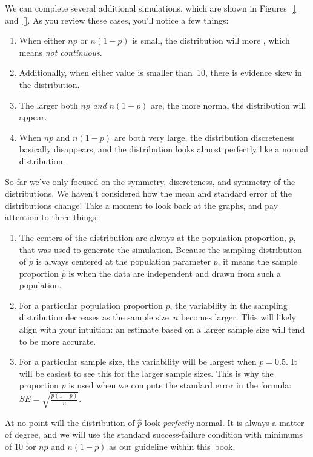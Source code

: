 We can complete several additional simulations, which are
shown in
Figures~\ref{}
and~\ref{}.
As you review these cases, you'll notice a few things:
\begin{enumerate}
\item When either $np$ or $n(1 - p)$ is small, the
    distribution will more , which means
    \emph{not continuous}.
\item Additionally, when either value is smaller
    than~10, there is evidence skew in the distribution.
\item The larger both $np$ \emph{and} $n(1 - p)$ are,
    the more normal the distribution will appear.
\item When $np$ and $n(1 - p)$ are both very large,
    the distribution discreteness basically disappears,
    and the distribution looks almost perfectly
    like a normal distribution.
\end{enumerate}

So far we've only focused on the symmetry, discreteness,
and symmetry of the distributions. We haven't considered
how the mean and standard error
of the distributions change!
Take a moment to look back at the graphs,
and pay attention to three things:
\begin{enumerate}
\item The centers of the distribution are always at
    the population proportion, $p$, that was used to
    generate the simulation. Because the sampling
    distribution of $\hat{p}$ is always centered at
    the population parameter $p$, it means the sample
    proportion $\hat{p}$ is  when
    the data are independent and drawn from such
    a population.
\item For a particular population proportion $p$,
    the variability in the sampling distribution
    decreases as the sample size~$n$ becomes larger.
    This will likely align with your intuition:
    an estimate based on a larger sample size will
    tend to be more accurate.
\item For a particular sample size, the variability
    will be largest when $p = 0.5$. It will be
    easiest to see this for the larger sample sizes.
    This is why the proportion $p$ is used when we
    compute the standard error in the formula:
    $SE = \sqrt{\frac{p (1 - p)}{n}}$.
\end{enumerate}

At no point will the distribution of $\hat{p}$ look
\emph{perfectly} normal.
It is always a matter of degree, and we will use
the standard success-failure condition with minimums
of 10 for $np$ and $n (1 - p)$ as our guideline
within this~book.





